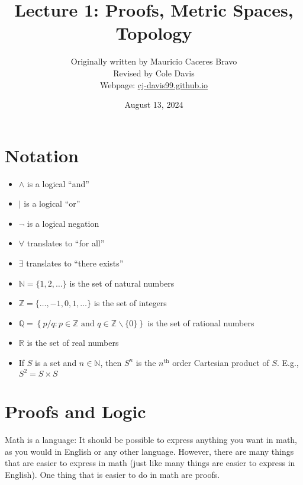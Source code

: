 \documentclass{article}
\title{Lecture 1: Proofs, Metric Spaces, Topology}
\author{Originally written by Mauricio Caceres Bravo\\Revised by Cole Davis\\Webpage: \href{https://cj-davis99.github.io/math-camp.html}{cj-davis99.github.io}}
\date{August 13, 2024}
\newcommand{\R}{\mathbb{R}}
\newcommand{\N}{\mathbb{N}}
\newcommand{\Q}{\mathbb{Q}}
\newcommand{\Z}{\mathbb{Z}}
\theoremstyle{definition}
\begin{document}
\maketitle
\tableofcontents
\newpage
\section*{Notation}
\begin{itemize}
    \item $\wedge$ is a logical ``and''
    \item $\mid$ is a logical ``or''
    \item $\neg$ is a logical negation
    \item $\forall$ translates to ``for all''
    \item $\exists$ translates to ``there exists''
    \item $\N = \{1,2, \hdots\}$ is the set of natural numbers
    \item $\Z = \{\hdots, -1, 0, 1, \hdots \}$ is the set of integers
    \item $\Q = \left\{ p/q : p \in \Z \text{ and } q \in \Z\backslash\{0\} \right\}$ is the set of rational numbers
    \item $\R$ is the set of real numbers
    \item If $S$ is a set and $n\in \N$, then $S^n$ is the $n^{\text{th}}$ order Cartesian product of $S$. E.g., $S^2 = S \times S$ 
\end{itemize}
\newpage
\section{Proofs and Logic}
Math is a language: It should be possible to express anything you want in math, as you would in English or any other language. However, there are many things that are easier to express in math (just like many things are easier to express in English). One thing that is easier to do in math are proofs.
\end{document}
